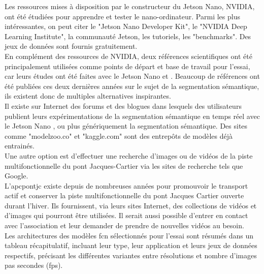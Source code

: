﻿\noindent Les ressources mises à disposition par le constructeur du Jetson Nano, NVIDIA, ont été étudiées pour apprendre et tester le nano-ordinateur. Parmi les plus intéressantes, on peut citer le "Jetson Nano Developer Kit", le "NVIDIA Deep Learning Institute", la communauté Jetson, les tutoriels, les "benchmarks". Des jeux de données sont fournis gratuitement.
\vspace{\baselineskip}
\\
\noindent En complément des ressources de NVIDIA, deux références scientifiques ont été principalement utilisées comme points de départ et base de travail pour l'essai, car leurs études ont été faites avec le Jetson Nano \parencite{nguyen_mavnet_2019} et \parencite{zheng_real-time_2020}. Beaucoup de références ont été publiées ces deux dernières années sur le sujet de la segmentation sémantique, ils existent donc de multiples alternatives inspirantes.
\vspace{\baselineskip}
\\
\noindent Il existe sur Internet des forums et des blogues dans lesquels des utilisateurs publient leurs expérimentations de la segmentation sémantique en temps réel avec le Jetson Nano \parencite{dustin_realtime_2019}, ou plus génériquement la segmentation sémantique. Des sites comme "modelzoo.co" et "kaggle.com" sont des entrepôts de modèles déjà entrainés. 
\vspace{\baselineskip}
\\
\noindent Une autre option est d'effectuer une recherche d'images ou de vidéos de la piste multifonctionnelle du pont Jacques-Cartier via les sites de recherche tels que Google. 
\vspace{\baselineskip}
\\
\noindent L'\acrlong{apcpontjc} existe depuis de nombreuses années pour promouvoir le transport actif et conserver la piste multifonctionnelle du pont Jacques Cartier ouverte durant l'hiver. Ils fournissent, via leurs sites Internet, des collections de vidéos et d'images qui pourront être utilisées. Il serait aussi possible d'entrer en contact avec l'association et leur demander de prendre de nouvelles vidéos au besoin. \parencite{association_des_pietons_et_cyclistes_du_pont_jacques-cartier_pontjacques-cartier365com_2020, association_des_pietons_et_cyclistes_pont_jacques-cartier_flickr_2020}
\vspace{\baselineskip}
\\
\noindent Les architectures des modèles \acrshort{fcn} sélectionnés pour l'essai sont résumés dans un tableau récapitulatif, incluant leur type, leur application et leurs jeux de données respectifs, précisant les différentes variantes entre résolutions et nombre d'images pas secondes (\acrshort{fps}).
